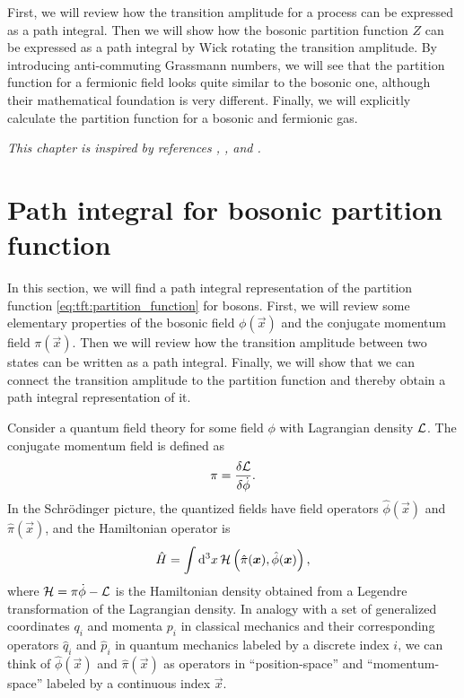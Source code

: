 First, we will review how the transition amplitude for a process can be expressed as a path integral.
Then we will show how the bosonic partition function $Z$ can be expressed as a path integral by Wick rotating the transition amplitude.
By introducing anti-commuting Grassmann numbers, we will see that the partition function for a fermionic field looks quite similar to the bosonic one, although their mathematical foundation is very different.
Finally, we will explicitly calculate the partition function for a bosonic and fermionic gas.

\textit{This chapter is inspired by references \cite{ref:kapusta}, \cite{ref:altland_simons}, \cite{ref:tft_basics} and \cite{ref:tft_random_note_1}.}

\section{Path integral for bosonic partition function}
\label{sec:tft:path_integral_boson}


In this section, we will find a path integral representation of the partition function \eqref{eq:tft:partition_function} for bosons.
First, we will review some elementary properties of the bosonic field $\phi(\vec{x})$ and the conjugate momentum field $\pi(\vec{x})$.
Then we will review how the transition amplitude between two states can be written as a path integral.
Finally, we will show that we can connect the transition amplitude to the partition function and thereby obtain a path integral representation of it.

Consider a quantum field theory for some field $\phi$ with Lagrangian density $\mathcal{L}$.
The conjugate momentum field is defined as
\begin{equation}
	\pi = \fdv{\lagr}{\dot\phi} .
\label{eq:tft:conjugate_mometum_definition}
\end{equation}
In the Schrödinger picture, the quantized fields have field operators $\hat{\phi}(\vec{x})$ and $\hat{\pi}(\vec{x})$, and the Hamiltonian operator is
\begin{equation}
	\hat{H} = \int \mathop{}\!\mathrm{d}^3 x \, \mathcal{H} \left( \hat{\pi}({\bm{x}}), \hat{\phi}({\bm{x}}) \right) ,
\end{equation}
where $\mathcal{H} = \pi \dot\phi - \mathcal{L}$ is the Hamiltonian density obtained from a Legendre transformation of the Lagrangian density.
In analogy with a set of generalized coordinates $q_i$ and momenta $p_i$ in classical mechanics and their corresponding operators $\hat{q}_i$ and $\hat{p}_i$ in quantum mechanics labeled by a discrete index $i$, we can think of $\hat\phi(\vec{x})$ and $\hat\pi(\vec{x})$ as operators in ``position-space'' and ``momentum-space'' labeled by a continuous index $\vec{x}$.

